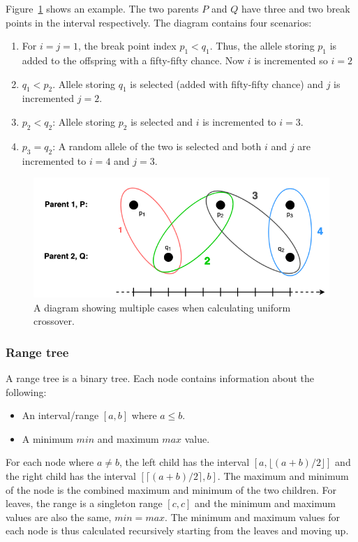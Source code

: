\begin{description}
    Figure~\ref{fig:uniform-crossover} shows an example. The two parents $P$ and
    $Q$ have three and two break points in the interval respectively. The
    diagram contains four scenarios:
    
    \begin{enumerate}
        \item For $i = j = 1$, the break point index $p_1 < q_1$. Thus, the
        allele storing $p_1$ is added to the offspring with a fifty-fifty
        chance. Now $i$ is incremented so $i = 2$ 
        
        \item $q_1 < p_2$. Allele storing $q_1$ is selected (added with
        fifty-fifty chance) and $j$ is
        incremented $j = 2$. 
        
        \item $p_2 < q_2$: Allele storing $p_2$ is selected and $i$ is
        incremented to $i = 3$. 
        
        \item $p_3 = q_2$: A random allele of the two is selected and both $i$
        and $j$ are incremented to $i = 4$ and $j = 3$. 
    \end{enumerate}
    
\end{description}

\begin{figure}[h]
    \centering
    \includegraphics[width=.8\textwidth]{fig/uniform-crossover.png}
    \caption{A diagram showing multiple cases when calculating uniform crossover.}
    \label{fig:uniform-crossover}
\end{figure}

\subsubsection{Range tree} \label{sec:range-tree-design}

A range tree is a binary tree. Each node contains information about the following:
\begin{itemize}
    \item An interval/range $[a,b]$ where $a \leq b$. 
    \item A minimum $min$ and maximum $max$ value. 
\end{itemize}
For each node where $a \neq b$, the left child has the interval $[a, \lfloor
(a+b)/2 \rfloor]$ and the right child has the interval $[\lceil
(a+b)/2 \rceil, b]$. The maximum and minimum of the node is the combined maximum
and minimum of the two children. For leaves, the range is a singleton range
$[c,c]$ and the minimum and maximum values are also the same, $min = max$. The minimum and
maximum values for each node is thus calculated recursively starting from the
leaves and moving up. 

